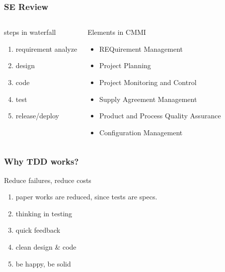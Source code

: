 \documentclass[lualatex]{beamer}
\begin{document}
\begin{frame}
  \frametitle{SE Review}

  \begin{columns}[t]
    \begin{block}{steps in waterfall}
      \begin{enumerate}
      \item
        requirement analyze
      \item 
        design
      \item 
        code
      \item 
        test
      \item 
        release/deploy
      \end{enumerate}
    \end{block}

    \begin{block}{Elements in CMMI}
      \begin{itemize}
      \item REQuirement Management
      \item Project Planning
      \item Project Monitoring and Control
      \item Supply Agreement Management 
      \item Product and Process Quality Assurance
      \item Configuration Management 
      \end{itemize}
    \end{block}
  \end{columns}
\end{frame}

\begin{frame}
  \frametitle{Why TDD works?}

  \begin{block}{Reduce failures, reduce costs}
    \begin{enumerate}
    \item
      paper works are reduced, since tests are specs.
    \item 
      thinking in testing
    \item
      quick feedback
    \item 
      clean design \& code
    \item 
      be happy, be solid
    \end{enumerate}
  \end{block}
\end{frame}
\end{document}
